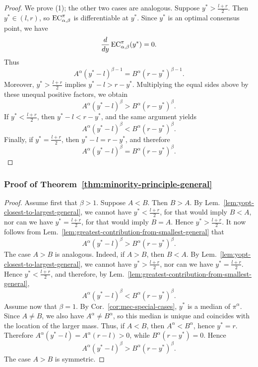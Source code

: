 \greatestContribution*
\begin{proof}
We prove (1); the other two cases are analogous. Suppose \(y^*>\frac{l+r}{2}\). Then \(y^*\in(l,r)\), so \(\EC[\alpha,\beta][\pi]\) is differentiable at \(y^*\). Since \(y^*\) is an optimal consensus point, we have
\[
\frac{d}{dy}\EC[\alpha,\beta][\pi](y^*)=0.
\]
Thus
\[
A^\alpha (y^*-l)^{\beta-1}=B^\alpha (r-y^*)^{\beta-1}.
\]
Moreover, \(y^*>\frac{l+r}{2}\) implies \(y^*-l>r-y^*\). Multiplying the equal sides above by these unequal positive factors, we obtain
\[
A^\alpha (y^*-l)^\beta > B^\alpha (r-y^*)^\beta.
\]
If \(y^*<\frac{l+r}{2}\), then \(y^*-l<r-y^*\), and the same argument yields
\[
A^\alpha (y^*-l)^\beta < B^\alpha (r-y^*)^\beta.
\]
Finally, if \(y^*=\frac{l+r}{2}\), then \(y^*-l=r-y^*\), and therefore
\[
A^\alpha (y^*-l)^\beta = B^\alpha (r-y^*)^\beta.
\]
\end{proof}

\subsubsection{Proof of Theorem~\ref{thm:minority-principle-general}}
\label{appendix:proof-minority-principle-general}

\minorityPrinciple*
\begin{proof}
Assume first that \(\beta>1\). Suppose \(A<B\). Then \(B>A\). By Lem.~\ref{lem:yopt-closest-to-largest-general}, we cannot have \(y^*<\frac{l+r}{2}\), for that would imply \(B<A\), nor can we have \(y^*=\frac{l+r}{2}\), for that would imply \(B=A\). Hence \(y^*>\frac{l+r}{2}\). It now follows from Lem.~\ref{lem:greatest-contribution-from-smallest-general} that
\[
A^\alpha (y^*-l)^\beta > B^\alpha (r-y^*)^\beta.
\]
The case \(A>B\) is analogous. Indeed, if \(A>B\), then \(B<A\). By Lem.~\ref{lem:yopt-closest-to-largest-general}, we cannot have \(y^*>\frac{l+r}{2}\), nor can we have \(y^*=\frac{l+r}{2}\). Hence \(y^*<\frac{l+r}{2}\), and therefore, by Lem.~\ref{lem:greatest-contribution-from-smallest-general},
\[
A^\alpha (y^*-l)^\beta < B^\alpha (r-y^*)^\beta.
\]
Assume now that \(\beta=1\). By Cor.~\ref{cor:mec-special-cases}, \(y^*\) is a median of \(\pi^\alpha\). Since \(A\neq B\), we also have \(A^\alpha\neq B^\alpha\), so this median is unique and coincides with the location of the larger mass. Thus, if \(A<B\), then \(A^\alpha<B^\alpha\), hence \(y^*=r\). Therefore \(A^\alpha (y^*-l)=A^\alpha(r-l)>0\), while \(B^\alpha(r-y^*)=0\). Hence
\[
A^\alpha (y^*-l)^\beta > B^\alpha (r-y^*)^\beta.
\]
The case \(A>B\) is symmetric.
\end{proof}
